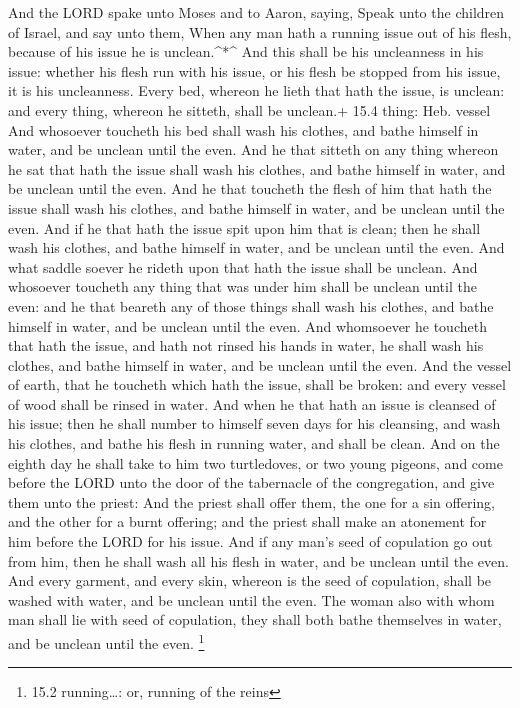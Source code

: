  And the LORD spake unto Moses and to Aaron, saying,
 Speak unto the children of Israel, and say unto them, When
any man hath a running issue out of his flesh, because of his issue he
is unclean.\^{}*\^{}  And this shall be his uncleanness in
his issue: whether his flesh run with his issue, or his flesh be stopped
from his issue, it is his uncleanness.  Every bed, whereon
he lieth that hath the issue, is unclean: and every thing, whereon he
sitteth, shall be unclean.+ 15.4 thing: Heb. vessel  And
whosoever toucheth his bed shall wash his clothes, and bathe himself in
water, and be unclean until the even.  And he that sitteth
on any thing whereon he sat that hath the issue shall wash his clothes,
and bathe himself in water, and be unclean until the even. 
And he that toucheth the flesh of him that hath the issue shall wash his
clothes, and bathe himself in water, and be unclean until the even.
 And if he that hath the issue spit upon him that is clean;
then he shall wash his clothes, and bathe himself in water, and be
unclean until the even.  And what saddle soever he rideth
upon that hath the issue shall be unclean.  And whosoever
toucheth any thing that was under him shall be unclean until the even:
and he that beareth any of those things shall wash his clothes, and
bathe himself in water, and be unclean until the even.  And
whomsoever he toucheth that hath the issue, and hath not rinsed his
hands in water, he shall wash his clothes, and bathe himself in water,
and be unclean until the even.  And the vessel of earth,
that he toucheth which hath the issue, shall be broken: and every vessel
of wood shall be rinsed in water.  And when he that hath an
issue is cleansed of his issue; then he shall number to himself seven
days for his cleansing, and wash his clothes, and bathe his flesh in
running water, and shall be clean.  And on the eighth day
he shall take to him two turtledoves, or two young pigeons, and come
before the LORD unto the door of the tabernacle of the congregation, and
give them unto the priest:  And the priest shall offer
them, the one for a sin offering, and the other for a burnt offering;
and the priest shall make an atonement for him before the LORD for his
issue.  And if any man's seed of copulation go out from
him, then he shall wash all his flesh in water, and be unclean until the
even.  And every garment, and every skin, whereon is the
seed of copulation, shall be washed with water, and be unclean until the
even.  The woman also with whom man shall lie with seed of
copulation, they shall both bathe themselves in water, and be unclean
until the even. \footnote{15.2 running\ldots: or, running of the reins}

